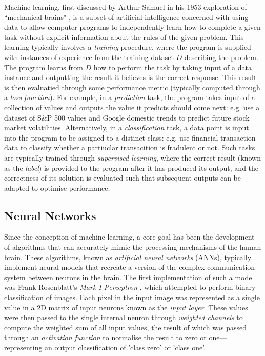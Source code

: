 \documentclass[a4paper, 11pt]{report}
\begin{document}
    Machine learning, first discussed by Arthur Samuel in his 1953 exploration of ``mechanical brains" \citep{samuel-1959}, is a subset of artificial intelligence concerned with using data to allow computer programs to independently learn how to complete a given task without explicit information about the rules of the given problem. This learning typically involves a \emph{training} procedure, where the program is supplied with instances of experience from the training dataset $D$ describing the problem. The program learns from $D$ how to perform the  task by taking input of a data instance and outputting the result it believes is the correct response. This result is then evaluatied through some performance metric (typically computed through a \emph{loss function}). For example, in a \emph{prediction} task, the program takes input of a collection of values and outputs the value it predicts should come next: e.g. \citet{xiong-2015} use a dataset of S\&P 500 values and Google domestic trends to predict future stock market volatilities. Alternatively, in a \emph{classification} task, a data point is input into the program to be assigned to a distinct class: e.g. \citet{sadgali-2019} use financial transaction data to classify whether a partiuclar transacition is fradulent or not. Such tasks are typically trained through \emph{supervised learning}, where the correct result (known as the \emph{label}) is provided to the program after it has produced its output, and the correctness of its solution is evaluated such that subsequent outputs can be adapted to optimise performance.


    \subsection{Neural Networks}

    Since the conception of machine learning, a core goal has been the development of algorithms that can accurately mimic the processing mechanisms of the human brain. These algorithms, known as \emph{artificial neural networks} (ANNs), typically implement neural models that recreate a version of the complex communication system between neurons in the brain. The first implementation of such a model was Frank Rosenblatt's \emph{Mark I Perceptron} \citep{rosenblatt-1958}, which attempted to perform binary classification of images. Each pixel in the input image was represented as a single value in a 2D matrix of input neurons known as the \emph{input layer}. These values were then passed to the single internal neuron through \emph{weighted channels} to compute the weighted sum of all input values,  the result of which was passed through an \emph{activation function} to normalise the result to zero or one—representing an output classification of 'class zero' or 'class one'. 
\end{document}
